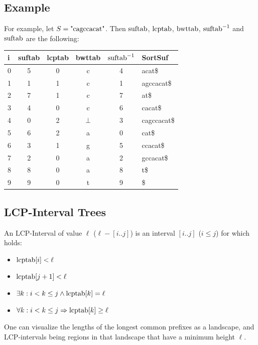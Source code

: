 \documentclass[a4paper,10pt]{article}
\begin{document}
\subsection*{Example}

For example, let $S=\hbox{"cagccacat"}$. Then $\hbox{suftab}$,
$\hbox{lcptab}$, $\hbox{bwttab}$, $\hbox{suftab}^{-1}$ and
$\hbox{suftab}$ are the following:

\begin{center}
	\begin{tabular}{ | l | c | c | c | c | l | }
		\hline
		i & suftab & lcptab & bwttab & $\hbox{suftab}^{-1}$ & SortSuf \\ \hline
		0 & 5 & 0 & c & 4 & acat\$ \\ \hline
		1 & 1 & 1 & c & 1 & agccacat\$ \\ \hline
		2 & 7 & 1 & c & 7 & at\$ \\ \hline
		3 & 4 & 0 & c & 6 & cacat\$ \\ \hline
		4 & 0 & 2 & $\bot$ & 3 & cagccacat\$ \\ \hline
		5 & 6 & 2 & a & 0 & cat\$ \\ \hline
		6 & 3 & 1 & g & 5 & ccacat\$ \\ \hline
		7 & 2 & 0 & a & 2 & gccacat\$ \\ \hline
		8 & 8 & 0 & a & 8 & t\$ \\ \hline
		9 & 9 & 0 & t & 9 & \$ \\ \hline
	\end{tabular}
\end{center}

\subsection*{LCP-Interval Trees}

An LCP-Interval of value $\ell$ ($\ell-[i..j]$) is an interval $[i..j]$ ($i \le j$)
for which holds:

\begin{itemize}
\item $\hbox{lcptab}[i]<\ell$
\item $\hbox{lcptab}[j+1]<\ell$
\item $\exists k: i<k\le j \land \hbox{lcptab}[k]=\ell$
\item $\forall k: i<k\le j \Rightarrow \hbox{lcptab}[k] \ge \ell$
\end{itemize}

One can visualize the lengths of the longest common prefixes as a
landscape, and LCP-intervals being regions in that landscape that have
a minimum height $\ell$.
\end{document}
